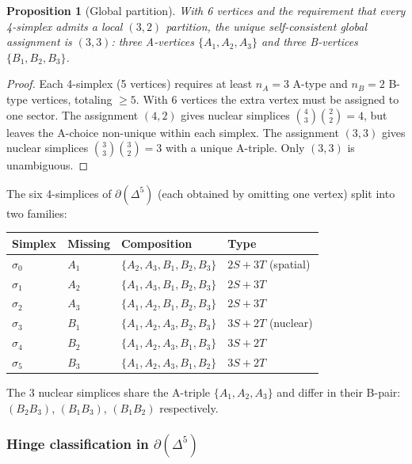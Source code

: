 \documentclass[12pt]{article}
\newtheorem{proposition}[theorem]{Proposition}
\theoremstyle{remark}
\theoremstyle{definition}
\begin{document}
\begin{proposition}[Global partition]
\label{prop:33_partition}
With 6 vertices and the requirement that every 4-simplex admits a local $(3,2)$ partition, the unique self-consistent global assignment is $(3,3)$: three A-vertices $\{A_1, A_2, A_3\}$ and three B-vertices $\{B_1, B_2, B_3\}$.
\end{proposition}

\begin{proof}
Each 4-simplex (5 vertices) requires at least $n_A = 3$ A-type and $n_B = 2$ B-type vertices, totaling $\geq 5$.  With 6 vertices the extra vertex must be assigned to one sector.  The assignment $(4, 2)$ gives nuclear simplices $\binom{4}{3}\binom{2}{2} = 4$, but leaves the A-choice non-unique within each simplex.  The assignment $(3, 3)$ gives nuclear simplices $\binom{3}{3}\binom{3}{2} = 3$ with a unique A-triple.  Only $(3, 3)$ is unambiguous.
\end{proof}

The six 4-simplices of $\partial(\Delta^5)$ (each obtained by omitting one vertex) split into two families:

\begin{center}
\begin{tabular}{llll}
\toprule
Simplex & Missing & Composition & Type \\
\midrule
$\sigma_0$ & $A_1$ & $\{A_2,A_3,B_1,B_2,B_3\}$ & $2S{+}3T$ (spatial) \\
$\sigma_1$ & $A_2$ & $\{A_1,A_3,B_1,B_2,B_3\}$ & $2S{+}3T$ \\
$\sigma_2$ & $A_3$ & $\{A_1,A_2,B_1,B_2,B_3\}$ & $2S{+}3T$ \\
$\sigma_3$ & $B_1$ & $\{A_1,A_2,A_3,B_2,B_3\}$ & $3S{+}2T$ (nuclear) \\
$\sigma_4$ & $B_2$ & $\{A_1,A_2,A_3,B_1,B_3\}$ & $3S{+}2T$ \\
$\sigma_5$ & $B_3$ & $\{A_1,A_2,A_3,B_1,B_2\}$ & $3S{+}2T$ \\
\bottomrule
\end{tabular}
\end{center}

\noindent
The 3 nuclear simplices share the A-triple $\{A_1, A_2, A_3\}$ and differ in their B-pair: $(B_2 B_3)$, $(B_1 B_3)$, $(B_1 B_2)$ respectively.

\subsubsection{Hinge classification in $\partial(\Delta^5)$}
\end{document}
